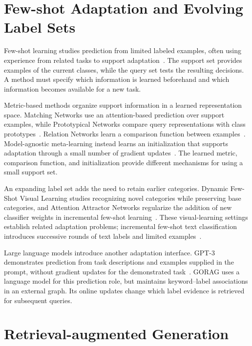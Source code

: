 \section{Few-shot Adaptation and Evolving Label Sets}
\label{sec:background:fewshot}

Few-shot learning studies prediction from limited labeled examples, often using experience from related tasks to support adaptation~\cite{lit-wang2020generalizing}. The support set provides examples of the current classes, while the query set tests the resulting decisions. A method must specify which information is learned beforehand and which information becomes available for a new task.

Metric-based methods organize support information in a learned representation space. Matching Networks use an attention-based prediction over support examples, while Prototypical Networks compare query representations with class prototypes~\cite{lit-vinyals2016matching,lit-snell2017prototypical}. Relation Networks learn a comparison function between examples~\cite{lit-sung2018learning}. Model-agnostic meta-learning instead learns an initialization that supports adaptation through a small number of gradient updates~\cite{lit-finn2017model}. The learned metric, comparison function, and initialization provide different mechanisms for using a small support set.

An expanding label set adds the need to retain earlier categories. Dynamic Few-Shot Visual Learning studies recognizing novel categories while preserving base categories, and Attention Attractor Networks regularize the addition of new classifier weights in incremental few-shot learning~\cite{lit-gidaris2018dynamic,lit-ren2019incremental}. These visual-learning settings establish related adaptation problems; incremental few-shot text classification introduces successive rounds of text labels and limited examples~\cite{gorag-xia-etal-2021-incremental}.

Large language models introduce another adaptation interface. GPT-3 demonstrates prediction from task descriptions and examples supplied in the prompt, without gradient updates for the demonstrated task~\cite{lit-brown2020language}. GORAG uses a language model for this prediction role, but maintains keyword--label associations in an external graph. Its online updates change which label evidence is retrieved for subsequent queries.

\section{Retrieval-augmented Generation}
\label{sec:background:rag}

